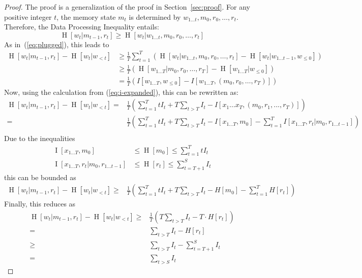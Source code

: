 \documentclass[11pt,letterpaper]{article}
\begin{document}
\begin{proof}
The proof is a generalization of the proof in Section~\ref{sec:proof}.
	For any positive integer $t$, the memory state $m_t$ is determined by $w_{1\dots t}, m_0, r_0, \dots, r_t$.
	Therefore, the Data Processing Inequality entails:
	\begin{equation}
		\operatorname{H}[w_t|m_{t-1}, r_t] \geq \operatorname{H}[w_t|w_{1\dots t}, m_0, r_0, \dots, r_t]
	\end{equation}
	As in~(\ref{eq:plugged}), this leads to
\begin{align}
\operatorname{H}[w_t | m_{t-1}, r_t] - \operatorname{H}[w_t | w_{<t}]& \geq \frac{1}{T} \sum_{t=1}^T ( \operatorname{H}[w_t|w_{1\dots t}, m_0, r_0, \dots, r_t] - \operatorname{H}[w_t | w_{1\dots t-1}, w_{\leq 0}]  )    \\
& \geq \frac{1}{T} \left(\operatorname{H}[w_{1\dots T} | m_0, r_0, \dots, r_T] - \operatorname{H}[w_{1\dots T} | w_{\leq 0}]\right)  \\
	& = \frac{1}{T} \left(I[w_{1\dots T}, w_{\leq 0}] - I[w_{1\dots T}, (m_0, r_0, \dots, r_T)]\right) 
\end{align}
	Now, using the calculation from (\ref{eq:i-expanded}), this can be rewritten as:
	\begin{align*}
\operatorname{H}[w_t | m_{t-1}, r_t] - \operatorname{H}[w_t | w_{<t}]= & \frac{1}{T}\left(\sum_{t=1}^T t I_t + T \sum_{t>T} I_t - I[x_1\dots x_T, (m_0, r_1, ..., r_T)]\right) \\
		= & \frac{1}{T}\left(\sum_{t=1}^T t I_t + T \sum_{t>T} I_t - I[x_{1\dots T}, m_0] - \sum_{t=1}^T I[x_{1\dots T}, r_t|m_0, r_{1\dots t-1}]\right) \\
	\end{align*}
	Due to the inequalities
	\begin{align}
	    \operatorname{I}[x_{1\dots T}, m_0] &\leq \operatorname{H}[m_0] \leq \sum_{t=1}^T t I_t\\
	    \operatorname{I}[x_{1\dots T}, r_t|m_0, r_{1\dots t-1}] &\leq \operatorname{H}[r_t] \leq \sum_{t=T+1}^S I_t
	\end{align}
	this can be bounded as
	\begin{align}
\operatorname{H}[w_t | m_{t-1}, r_t] - \operatorname{H}[w_t | w_{<t}]		\geq & \frac{1}{T}\left(\sum_{t=1}^T t I_t  + T \sum_{t>T} I_t-H[m_0] - \sum_{t=1}^T H[r_t]\right)
	\end{align}
	Finally, this reduces as
	\begin{align}
	\operatorname{H}[w_t | m_{t-1}, r_t] - \operatorname{H}[w_t | w_{<t}]		\geq &  \frac{1}{T}(T \sum_{t>T} I_t - T\cdot H[r_t]) \\
	= & \sum_{t>T} I_t- H[r_t]  \\
		\geq & \sum_{t>T} I_t - \sum_{t=T+1}^S I_t \\
		= &  \sum_{t>S} I_t
\end{align}

\end{proof}
\end{document}
